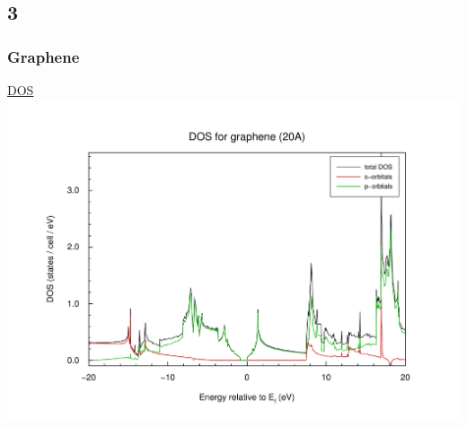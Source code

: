 \documentclass{beamer}
\begin{document}
	\subsection*{3}
		\begin{frame}
			\frametitle{Graphene}
			\underline{DOS}
			\includegraphics[width=\textwidth]{figures/GrapheneNew/dos.pdf}
		\end{frame}
	
\end{document}
